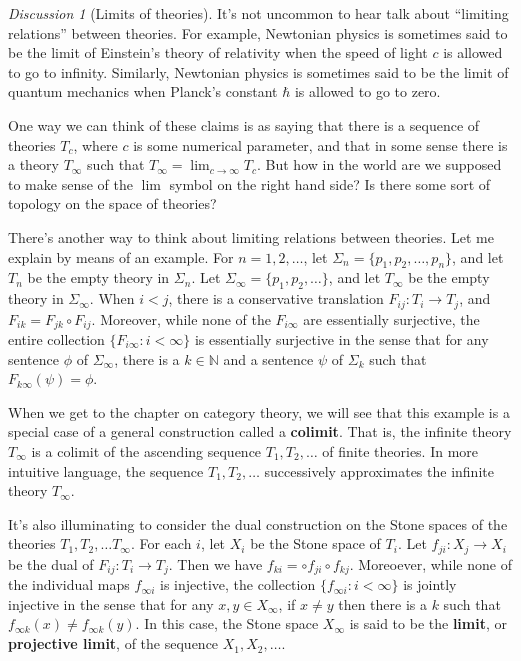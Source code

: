 \documentclass[11pt]{article}
\theoremstyle{definition}
\theoremstyle{remark}
\newtheorem*{disc}{Discussion}
\begin{document}
\begin{disc}[Limits of theories] It's not uncommon to hear talk about
  ``limiting relations'' between theories.  For example, Newtonian
  physics is sometimes said to be the limit of Einstein's theory of
  relativity when the speed of light $c$ is allowed to go to infinity.
  Similarly, Newtonian physics is sometimes said to be the limit of
  quantum mechanics when Planck's constant $\hbar$ is allowed to go to
  zero.

  One way we can think of these claims is as saying that there is a
  sequence of theories $T_c$, where $c$ is some numerical parameter,
  and that in some sense there is a theory $T_\infty$ such that
  $T_\infty=\lim _{c\to\infty}T_c$.  But how in the world are we
  supposed to make sense of the $\lim$ symbol on the right hand side?
  Is there some sort of topology on the space of theories?

  There's another way to think about limiting relations between
  theories.  Let me explain by means of an example.  For $n=1,2,\dots
  $, let $\Sigma _n=\{ p_1,p_2,\dots ,p_n \}$, and let $T_n$ be the
  empty theory in $\Sigma _n$.  Let $\Sigma _\infty =\{ p_1,p_2,\dots
  \}$, and let $T_\infty$ be the empty theory in $\Sigma _\infty$.
  When $i<j$, there is a conservative translation $F_{ij}:T_i\to T_j$,
  and $F_{ik}=F_{jk}\circ F_{ij}$.  Moreover, while none of the
  $F_{i\infty}$ are essentially surjective, the entire collection $\{
  F_{i\infty }:i<\infty \}$ is essentially surjective in the sense
  that for any sentence $\phi$ of $\Sigma _{\infty}$, there is a $k\in
  \mathbb{N}$ and a sentence $\psi$ of $\Sigma _k$ such that
  $F_{k\infty}(\psi )=\phi$. 

  When we get to the chapter on category theory, we will see that this
  example is a special case of a general construction called a
  \textbf{colimit}.  That is, the infinite theory $T_\infty$ is a
  colimit of the ascending sequence $T_1,T_2,\dots $ of finite
  theories.  In more intuitive language, the sequence $T_1,T_2,\dots $
  successively approximates the infinite theory $T_\infty$.

  It's also illuminating to consider the dual construction on the
  Stone spaces of the theories $T_1,T_2,\dots T_\infty$.  For each
  $i$, let $X_i$ be the Stone space of $T_i$.  Let $f_{ji}:X_j\to X_i$
  be the dual of $F_{ij}:T_i\to T_j$.  Then we have $f_{ki}=\circ
  f_{ji}\circ f_{kj}$.  Moreoever, while none of the individual maps
  $f_{\infty i}$ is injective, the collection $\{ f_{\infty
    i}:i<\infty \}$ is jointly injective in the sense that for any
  $x,y\in X_\infty$, if $x\neq y$ then there is a $k$ such that
  $f_{\infty k}(x)\neq f_{\infty k}(y)$.  In this case, the Stone
  space $X_{\infty}$ is said to be the \textbf{limit}, or
  \textbf{projective limit}, of the sequence $X_1,X_2,\dots $.


\end{disc}
\end{document}
